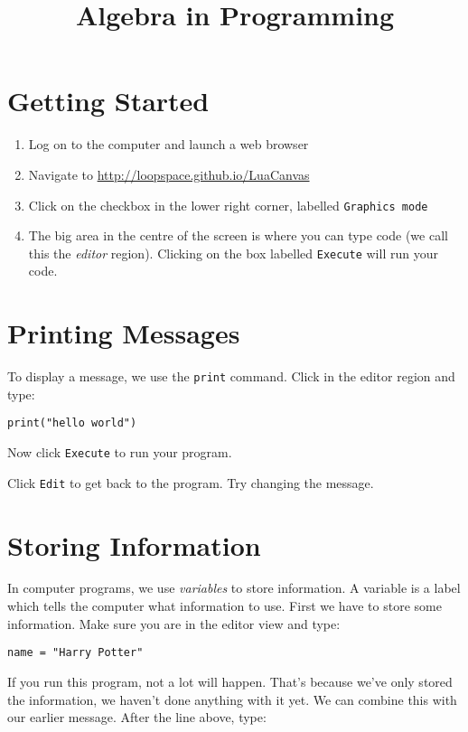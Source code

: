 \documentclass[
  xhtml,%
  text
]{internet}
\title{Algebra in Programming}
\begin{document}
\maketitle

\section*{Getting Started}

\begin{enumerate}
\item Log on to the computer and launch a web browser
\item Navigate to \href{http://loopspace.github.io/LuaCanvas}{http://loopspace.github.io/LuaCanvas}
\item Click on the checkbox in the lower right corner, labelled \verb+Graphics mode+
\item The big area in the centre of the screen is where you can type code (we call this the \emph{editor} region).
Clicking on the box labelled \verb+Execute+ will run your code.
\end{enumerate}

\section*{Printing Messages}

To display a message, we use the \verb+print+ command.
Click in the editor region and type:

\begin{verbatim}
print("hello world")
\end{verbatim}

Now click \verb+Execute+ to run your program.

Click \verb+Edit+ to get back to the program.
Try changing the message.

\section*{Storing Information}

In computer programs, we use \emph{variables} to store information.
A variable is a label which tells the computer what information to use.
First we have to store some information.
Make sure you are in the editor view and type:

\begin{verbatim}
name = "Harry Potter"
\end{verbatim}

If you run this program, not a lot will happen.
That's because we've only stored the information, we haven't done anything with it yet.
We can combine this with our earlier message.
After the line above, type:
\end{document}
